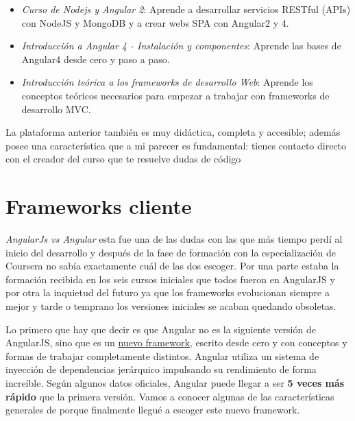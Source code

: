\begin{itemize}
	\item \emph{Curso de Nodejs y Angular 2}: Aprende a desarrollar servicios RESTful (APIs) con NodeJS y MongoDB y a crear webs SPA con Angular2 y 4. \cite{curso1}
	\item  \emph{Introducción a Angular 4 - Instalación y componentes}: Aprende las bases de Angular4 desde cero y paso a paso. \cite{curso2}
	\item \emph{Introducción teórica a los frameworks de desarrollo Web}: Aprende los conceptos teóricos necesarios para empezar a trabajar con frameworks de desarrollo MVC. \cite{curso3}
\end{itemize}


La plataforma anterior también es muy didáctica, completa y accesible; además posee una característica que a mi parecer es fundamental: tienes contacto directo con el creador del curso que te resuelve dudas de código


 \section{Frameworks cliente}\label{cliente}
 
 \emph{AngularJs vs Angular } esta fue una de las dudas con las que más tiempo perdí al inicio del desarrollo y después de la fase de formación con la especialización de Coursera no sabía exactamente cuál de las dos escoger. Por una parte estaba la formación recibida en los seis cursos iniciales que todos fueron en AngularJS y por otra la inquietud del futuro ya que los frameworks evolucionan siempre a mejor y tarde o temprano los versiones iniciales se acaban quedando obsoletas. 
 
 Lo primero que hay que decir es que Angular no es la siguiente versión de AngularJS, sino que es un \underline{nuevo framework}, escrito desde cero y con conceptos y formas de trabajar completamente distintos. Angular utiliza un sistema de inyección de dependencias jerárquico impulsando su rendimiento de forma increíble.  Según algunos datos oficiales, Angular puede llegar a ser \textbf{5 veces más rápido} que la primera versión.  Vamos a conocer algunas de las características generales de porque finalmente llegué a escoger este nuevo framework. 
 

